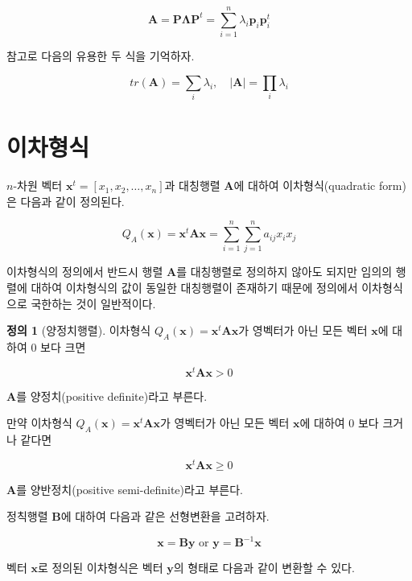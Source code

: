 \documentclass[
]{book}
\newcommand{\bm}[1]{\boldsymbol{\mathbf{#1}}}
\theoremstyle{definition}
\newtheorem{definition}{정의}[chapter]
\theoremstyle{definition}
\theoremstyle{definition}
\theoremstyle{definition}
\theoremstyle{remark}
\begin{document}
\begin{equation}
 \bm A  = \bm P \bm \Lambda \bm P^t  = \sum_{i=1}^n \lambda_i \bm p_i \bm {p}_i^t 
 \label{eq:spectral}
\end{equation}

참고로 다음의 유용한 두 식을 기억하자.

\[ tr(\bm A) = \sum_i \lambda_i ,\quad |\bm A| = \prod_i \lambda_i \]

\hypertarget{uxc774uxcc28uxd615uxc2dd-1}{%
\section{이차형식}\label{uxc774uxcc28uxd615uxc2dd-1}}

\(n\)-차원 벡터 \(\bm x^t=[x_1,x_2,\dots,x_n]\)과 대칭행렬 \(\bm A\)에 대하여 이차형식(quadratic form)은 다음과 같이 정의된다.

\begin{equation}
Q_A(\bm x) = \bm x^t \bm A \bm x =\sum_{i=1}^n \sum_{j=1}^n a_{ij} x_i x_j 
\label{eq:quadratic}
\end{equation}

이차형식의 정의에서 반드시 행렬 \(\bm A\)를 대칭행렬로 정의하지 않아도 되지만 임의의 행렬에 대하여 이차형식의 값이 동일한 대칭행렬이 존재하기 때문에 정의에서 이차형식으로 국한하는 것이 일반적이다.

\begin{definition}[양정치행렬]
\protect\hypertarget{def:unnamed-chunk-24}{}{\label{def:unnamed-chunk-24} {} }
이차형식 \(Q_A(\bm x) = \bm x^t \bm A \bm x\)가 영벡터가 아닌 모든 벡터 \(\bm x\)에 대하여 0 보다 크면

\[ \bm x^t \bm A \bm x  >0 \]

\(\bm A\)를 양정치(positive definite)라고 부른다.

만약 이차형식 \(Q_A(\bm x) = \bm x^t \bm A \bm x\)가 영벡터가 아닌 모든 벡터 \(\bm x\)에 대하여 0 보다 크거나 같다면

\[ \bm x^t \bm A \bm x  \ge 0 \]

\(\bm A\)를 양반정치(positive semi-definite)라고 부른다.
\end{definition}

정칙행렬 \(\bm B\)에 대하여 다음과 같은 선형변환을 고려하자.

\[   \bm x = \bm B \bm y \text{ or } \bm y = \bm {B}^{-1} \bm x \]

벡터 \(\bm x\)로 정의된 이차형식은 벡터 \(\bm y\)의 형태로 다음과 같이 변환할 수 있다.
\end{document}
